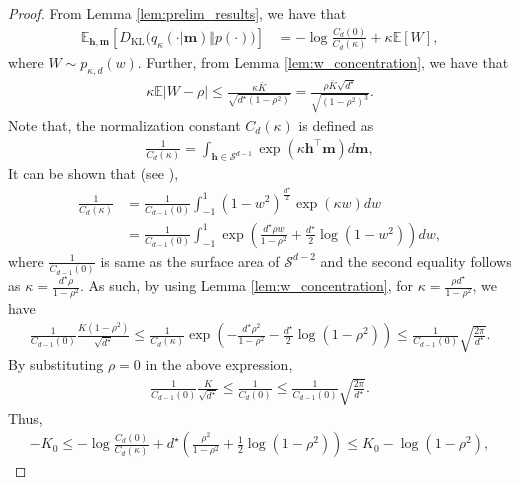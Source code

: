\documentclass[12pt]{article}
\theoremstyle{definition}
\theoremstyle{remark}
\begin{document}
\begin{proof}
From Lemma \ref{lem:prelim_results}, we have that
\begin{align*}
    \mathbb E_{\mathbf h,\mathbf m} \left[D_{\mathrm{KL}}\big(q_\kappa(\cdot| \mathbf m) \Vert p(\cdot)\big)\right]
&= -\log\frac{C_d(0)}{C_d(\kappa)}+\kappa \mathbb E[W],
\end{align*}
where $W \sim p_{\kappa, d}(w)$. Further, from Lemma \ref{lem:w_concentration}, we have that
\begin{align}
\label{eq:kappa_w_bound}
    \kappa\mathbb{E} |W - \rho| \leq \frac{\kappa \bar K}{\sqrt{d^\star (1-\rho^2)}} = \frac{\rho \bar K \sqrt{d^\star }}{\sqrt{(1-\rho^2)^3}}.
\end{align}
Note that, the normalization constant $C_d(\kappa)$ is defined as
\begin{align*}
   \frac{1}{C_d(\kappa)} = \int_{\mathbf{h} \in \mathcal{S}^{d-1}} \exp(\kappa \mathbf{h}^\top \mathbf{m}) d\mathbf{m},
\end{align*}
It can be shown that (see \citep{mardia2009directional}),
\begin{align*}
    \frac{1}{C_d(\kappa)} &= \frac{1}{C_{d-1}(0)} \int_{-1}^1 (1-w^2)^{\frac{d^\star}{2}} \exp \left( \kappa w \right) dw \\
    &= \frac{1}{C_{d-1}(0)} \int_{-1}^1 \exp \left( \frac{d^\star\rho w}{1-\rho^2} + \frac{d^\star}{2} \log(1-w^2) \right) dw,
\end{align*}
where $\frac{1}{C_{d-1}(0)}$ is same as the surface area of $\mathcal{S}^{d-2}$ and the second equality follows as $\kappa = \frac{d^\star\rho}{1-\rho^2}$. As such, by using Lemma \ref{lem:w_concentration}, for $\kappa = \frac{\rho d^\star}{1-\rho^2}$, we have
\begin{align*}
   \frac{1}{C_{d-1}(0)} \frac{K (1-\rho^2)}{\sqrt{d^\star}}  \leq \frac{1}{C_{d}(\kappa)} \exp \left( - \frac{d^\star\rho^2}{1-\rho^2} - \frac{d^\star}{2} \log(1-\rho^2)\right) \leq \frac{1}{C_{d-1}(0)} \sqrt{\frac{2\pi}{d^\star}}.
\end{align*}
By substituting $\rho = 0$ in the above expression,
\begin{align*}
   \frac{1}{C_{d-1}(0)} \frac{K}{\sqrt{d^\star}} \leq \frac{1}{C_{d}(0)} \leq \frac{1}{C_{d-1}(0)} \sqrt{\frac{2\pi}{d^\star}}.
\end{align*}
Thus,
\begin{align*}
  -K_0 \leq  -\log \frac{C_{d}(0)}{C_{d}(\kappa)} +  d^\star \left( \frac{\rho^2}{1-\rho^2} +\frac{1}{2} \log(1-\rho^2)\right) \leq K_0 - \log (1-\rho^2),

\end{align*}
\end{proof}
\end{document}
